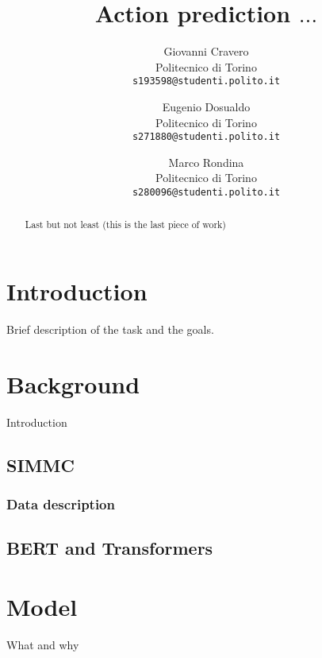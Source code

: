 \documentclass[final]{cvpr}
\begin{document}
	
	\title{Action prediction $\ldots$}
	
	\author{Giovanni Cravero\\
		Politecnico di Torino\\
		{\tt\small s193598@studenti.polito.it}
		\and
		Eugenio Dosualdo\\
		Politecnico di Torino\\
		{\tt\small s271880@studenti.polito.it}
		\and
		Marco Rondina\\
		Politecnico di Torino\\
		{\tt\small s280096@studenti.polito.it}
	}
	
	\maketitle
	
	\begin{abstract}
		Last but not least (this is the last piece of work)
	\end{abstract}
	
	\section{Introduction}
	Brief description of the task and the goals.
	
	\section{Background}
	Introduction
	\subsection{SIMMC}
	
	\subsubsection{Data description}
	
	\subsection{BERT and Transformers}
	
	\section{Model}
	What and why
	
\end{document}
